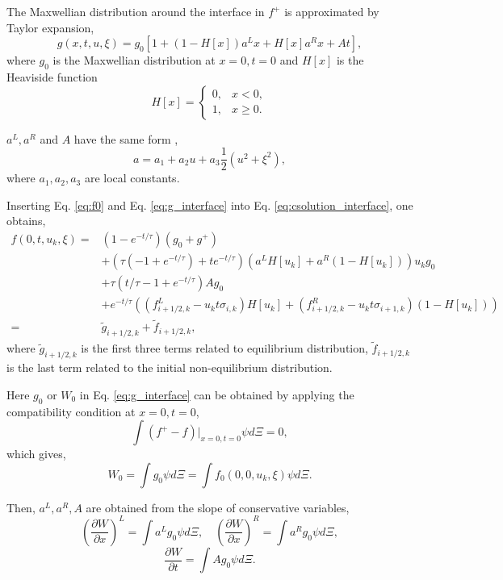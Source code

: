 \documentclass[a4paper]{book}
\begin{document}
The Maxwellian distribution around the interface in $f^+$ is approximated by Taylor expansion,
\begin{equation} 
    \label{eq:g_interface}
    g(x,t,u,\xi)=g_0[1+(1-H[x])a^Lx+H[x]a^Rx+At],
\end{equation}
where $g_0$ is the Maxwellian distribution at $x=0,t=0$ and $H[x]$ is the Heaviside function
$$H[x]=\begin{cases}0,& x<0,\\ 1,& x\geqslant 0.\end{cases}$$

$a^L,a^R$ and $A$ have the same form \cite{Xu2001},
$$ a = a_1+a_2u+a_3\frac{1}{2}(u^2+\xi^2),$$
where $a_1,a_2,a_3$ are local constants.

Inserting Eq. \ref{eq:f0} and Eq. \ref{eq:g_interface} into Eq. \ref{eq:csolution_interface}, one obtains,
\begin{equation} 
    \label{eq:csolution_final}
    \begin{aligned}
        f(0,t,u_k,\xi)=&(1-e^{-t/\tau})(g_0+g^+)\\
                       &+(\tau(-1+e^{-t/\tau})+te^{-t/\tau})(a^LH[u_k]+a^R(1-H[u_k]))u_kg_0\\
                       &+\tau(t/\tau-1+e^{-t/\tau})Ag_0\\
                       &+e^{-t/\tau}((f_{i+1/2,k}^L-u_kt\sigma_{i,k})H[u_k]+(f_{i+1/2,k}^R-u_kt\sigma_{i+1,k})(1-H[u_k]))\\
        =&{\tilde g}_{i+1/2,k}+{\tilde f}_{i+1/2,k},
    \end{aligned}
\end{equation}
where ${\tilde g}_{i+1/2,k}$ is the first three terms related to equilibrium distribution, ${\tilde f}_{i+1/2,k}$ is the last term related to the initial non-equilibrium distribution.

Here $g_0$ or $W_0$ in Eq. \ref{eq:g_interface} can be obtained by applying the compatibility condition at $x=0,t=0$,
$$\int (f^+-f)|_{x=0,t=0}\psi d\Xi=0,$$
which gives,
\begin{equation} 
    \label{eq:solve_g0}
    W_0=\int g_0\psi d\Xi=\int f_0(0,0,u_k,\xi)\psi d\Xi.
\end{equation}

Then, $a^L,a^R,A$ are obtained from the slope of conservative variables,
\begin{equation}
    \label{eq:microslope_space}
    \left(\frac{\partial W}{\partial x}\right)^L=\int a^L g_0\psi d\Xi,\quad \left(\frac{\partial W}{\partial x}\right)^R=\int a^R g_0\psi d\Xi,
\end{equation}
\begin{equation} 
    \label{eq:microslope_time}
    \frac{\partial W}{\partial t}=\int Ag_0\psi d\Xi.
\end{equation}
\end{document}
